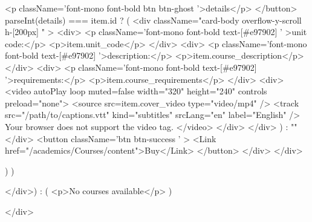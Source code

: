 {{                      <p className='font-mono font-bold btn btn-ghost '>details</p>
                    </button>
                    {parseInt(details) === item.id ? (
                      <div className="card-body overflow-y-scroll h-[200px] " >
                        <div>
                          <p className='font-mono font-bold text-[#e97902] ' >unit code:</p>
                          <p>{item.unit_code}</p>
                        </div>
                        <div>
                          <p className='font-mono font-bold text-[#e97902] '>description:</p>
                          <p>{item.course_description}</p>
                        </div>
                        <div>
                          <p className='font-mono font-bold text-[#e97902] '>requirements:</p>
                          <p>{item.course_requirements}</p>
                        </div>
                        <div>
                          <video autoPlay loop muted={false} width="320" height="240" controls preload="none">
                            <source src={item.cover_video} type="video/mp4" />
                            <track
                              src="/path/to/captions.vtt"
                              kind="subtitles"
                              srcLang="en"
                              label="English"
                            />
                            Your browser does not support the video tag.
                          </video>
                        </div>
                      </div>
                    ) : ""}
                  </div>
                  <button className='btn btn-success ' >
                    <Link href="/academics/Courses/content">Buy</Link>
                  </button>
                </div>
              </div>

            )
            )}
          </div>) : (
          <p>No courses available</p>
        )}
      </div>